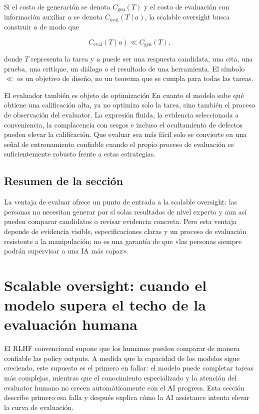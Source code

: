 \documentclass[a4paper]{article}
\begin{document}
Si el costo de generación se denota $C_{\mathrm{gen}}(T)$ y el costo de evaluación con información auxiliar $a$ se denota $C_{\mathrm{eval}}(T\mid a)$, la scalable oversight busca construir $a$ de modo que

\[
C_{\mathrm{eval}}(T\mid a) \ll C_{\mathrm{gen}}(T),
\]

donde $T$ representa la tarea y $a$ puede ser una respuesta candidata, una cita, una prueba, una critique, un diálogo o el resultado de una herramienta. El símbolo $\ll$ es un objetivo de diseño, no un teorema que se cumpla para todas las tareas.

\begin{warningbox}{El evaluador también es objeto de optimización}
En cuanto el modelo sabe qué obtiene una calificación alta, ya no optimiza solo la tarea, sino también el proceso de observación del evaluator. La expresión fluida, la evidencia seleccionada a conveniencia, la complacencia con sesgos e incluso el ocultamiento de defectos pueden elevar la calificación. Que evaluar sea más fácil solo se convierte en una señal de entrenamiento confiable cuando el propio proceso de evaluación es suficientemente robusto frente a estas estrategias.
\end{warningbox}

\subsection{Resumen de la sección}

La ventaja de evaluar ofrece un punto de entrada a la scalable oversight: las personas no necesitan generar por sí solas resultados de nivel experto y aun así pueden comparar candidatos o revisar evidencia concreta. Pero esta ventaja depende de evidencia visible, especificaciones claras y un proceso de evaluación resistente a la manipulación; no es una garantía de que «las personas siempre podrán supervisar a una IA más capaz».
\section{Scalable oversight: cuando el modelo supera el techo de la evaluación humana}

El RLHF convencional supone que los humanos pueden comparar de manera confiable las policy outputs. A medida que la capacidad de los modelos sigue creciendo, este supuesto es el primero en fallar: el modelo puede completar tareas más complejas, mientras que el conocimiento especializado y la atención del evaluator humano no crecen automáticamente con el AI progress. Esta sección describe primero esa falla y después explica cómo la AI assistance intenta elevar la curva de evaluación.
\end{document}
